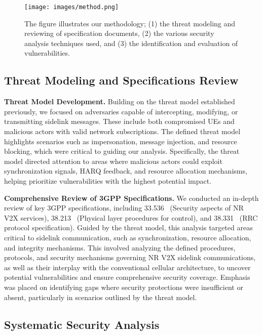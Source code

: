 \begin{figure*}[!t]
     \centering
     \texttt{[image: images/method.png]}
     \caption{The figure illustrates our methodology; (1) the threat modeling and reviewing of specification documents, (2) the various security analysis techniques used, and (3) the identification and evaluation of vulnerabilities.}
     \label{fig:method}
\end{figure*}

\subsection{Threat Modeling and Specifications Review}

\noindent\textbf{Threat Model Development.} Building on the threat model established previously, we focused on adversaries capable of intercepting, modifying, or transmitting sidelink messages. These include both compromised UEs and malicious actors with valid network subscriptions. The defined threat model highlights scenarios such as impersonation, message injection, and resource blocking, which were critical to guiding our analysis. Specifically, the threat model directed attention to areas where malicious actors could exploit synchronization signals, HARQ feedback, and resource allocation mechanisms, helping prioritize vulnerabilities with the highest potential impact. 

\noindent\textbf{Comprehensive Review of 3GPP Specifications.} We conducted an in-depth review of key 3GPP specifications, including 33.536~\cite{3gpp.33.536} (Security aspects of NR V2X services), 38.213~\cite{3gpp.38.213} (Physical layer procedures for control), and 38.331~\cite{3gpp.38.331} (RRC protocol specification). Guided by the threat model, this analysis targeted areas critical to sidelink communication, such as synchronization, resource allocation, and integrity mechanisms. This involved analyzing the defined procedures, protocols, and security mechanisms governing NR V2X sidelink communications, as well as their interplay with the conventional cellular architecture, to uncover potential vulnerabilities and ensure comprehensive security coverage. Emphasis was placed on identifying gaps where security protections were insufficient or absent, particularly in scenarios outlined by the threat model.

\subsection{Systematic Security Analysis}

